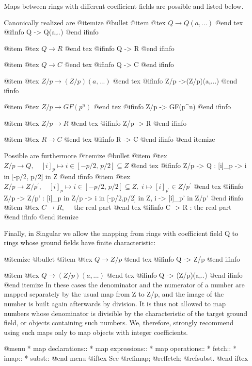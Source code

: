 {{{{{{Maps between rings with different coefficient fields are
possible and listed below.

Canonically realized are
@itemize @bullet
@item
@tex
$Q \rightarrow  Q(a, \ldots)$
@end tex
@ifinfo
Q -> Q(a,..)
@end ifinfo

@item
@tex
$Q \rightarrow R$
@end tex
@ifinfo
Q -> R
@end ifinfo

@item
@tex
$Q \rightarrow  C$
@end tex
@ifinfo
Q -> C
@end ifinfo

@item
@tex
$Z/p \rightarrow  (Z/p)(a, \ldots)$
@end tex
@ifinfo
Z/p ->(Z/p)(a,...)
@end ifinfo

@item
@tex
$Z/p \rightarrow  GF(p^n)$
@end tex
@ifinfo
Z/p -> GF(p^n)
@end ifinfo

@item
@tex
$Z/p \rightarrow  R$
@end tex
@ifinfo
Z/p -> R
@end ifinfo

@item
@tex
$R \rightarrow C$
@end tex
@ifinfo
R -> C
@end ifinfo
@end itemize

Possible are furthermore
@itemize @bullet
@item
@tex
$Z/p \rightarrow Q,
\quad
[i]_p \mapsto i \in [-p/2, \, p/2]
\subseteq Z$
@end tex
@ifinfo
Z/p -> Q : [i]_p -> i in [-p/2, p/2] in Z
@end ifinfo
@item
@tex
$Z/p \rightarrow Z/p^\prime,
\quad
[i]_p \mapsto i \in [-p/2, \, p/2] \subseteq Z, \;
i \mapsto [i]_{p^\prime} \in Z/p^\prime$
@end tex
@ifinfo
Z/p -> Z/p' : [i]_p in Z/p -> i in [-p/2,p/2] in Z, i -> [i]_p' in Z/p'
@end ifinfo
@item
@tex
$C \rightarrow R, \quad$ the real part
@end tex
@ifinfo
C -> R : the real part
@end ifinfo
@end itemize

Finally, in Singular we allow the mapping from rings
with coefficient field Q to rings whose ground fields
have finite characteristic:

@itemize @bullet
@item
@tex
$Q \rightarrow Z/p$
@end tex
@ifinfo
Q -> Z/p
@end ifinfo

@item
@tex
$Q \rightarrow (Z/p)(a, \ldots)$
@end tex
@ifinfo
Q -> (Z/p)(a,..)
@end ifinfo
@end itemize
In these cases the denominator and the numerator
of a number are mapped separately by the usual
map from Z to Z/p, and the image of the number
is built again afterwards by division. It is thus
not allowed to map numbers whose denominator is
divisible by the characteristic of the target
ground field, or objects containing such numbers.
We, therefore, strongly recommend using such
maps only to map objects with integer coefficients.


@menu
* map declarations::
* map expressions::
* map operations::
* fetch::
* imap::
* subst::
@end menu
@iftex
See @ref{imap}; @ref{fetch}; @ref{subst}.
@end iftex

}}}}}}
